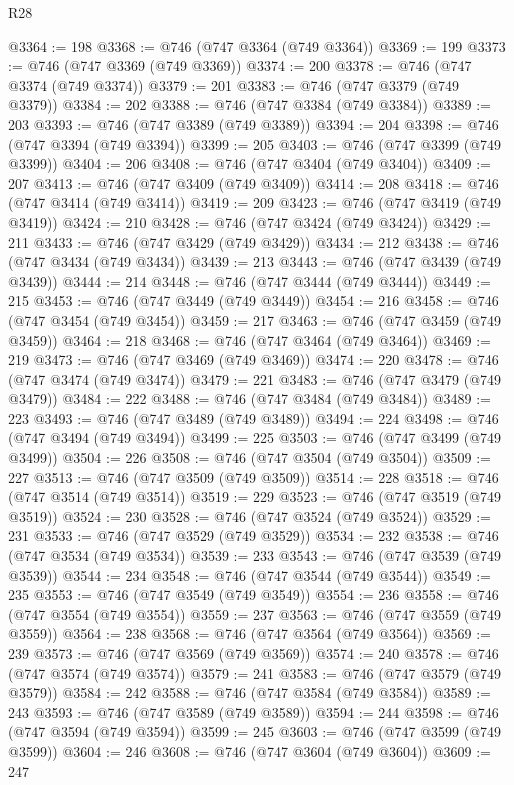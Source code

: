 \begin{lexlean}{R28}
\begin{coremodule}
@3364 := 198
@3368 := @746 (@747 @3364 (@749 @3364))
@3369 := 199
@3373 := @746 (@747 @3369 (@749 @3369))
@3374 := 200
@3378 := @746 (@747 @3374 (@749 @3374))
@3379 := 201
@3383 := @746 (@747 @3379 (@749 @3379))
@3384 := 202
@3388 := @746 (@747 @3384 (@749 @3384))
@3389 := 203
@3393 := @746 (@747 @3389 (@749 @3389))
@3394 := 204
@3398 := @746 (@747 @3394 (@749 @3394))
@3399 := 205
@3403 := @746 (@747 @3399 (@749 @3399))
@3404 := 206
@3408 := @746 (@747 @3404 (@749 @3404))
@3409 := 207
@3413 := @746 (@747 @3409 (@749 @3409))
@3414 := 208
@3418 := @746 (@747 @3414 (@749 @3414))
@3419 := 209
@3423 := @746 (@747 @3419 (@749 @3419))
@3424 := 210
@3428 := @746 (@747 @3424 (@749 @3424))
@3429 := 211
@3433 := @746 (@747 @3429 (@749 @3429))
@3434 := 212
@3438 := @746 (@747 @3434 (@749 @3434))
@3439 := 213
@3443 := @746 (@747 @3439 (@749 @3439))
@3444 := 214
@3448 := @746 (@747 @3444 (@749 @3444))
@3449 := 215
@3453 := @746 (@747 @3449 (@749 @3449))
@3454 := 216
@3458 := @746 (@747 @3454 (@749 @3454))
@3459 := 217
@3463 := @746 (@747 @3459 (@749 @3459))
@3464 := 218
@3468 := @746 (@747 @3464 (@749 @3464))
@3469 := 219
@3473 := @746 (@747 @3469 (@749 @3469))
@3474 := 220
@3478 := @746 (@747 @3474 (@749 @3474))
@3479 := 221
@3483 := @746 (@747 @3479 (@749 @3479))
@3484 := 222
@3488 := @746 (@747 @3484 (@749 @3484))
@3489 := 223
@3493 := @746 (@747 @3489 (@749 @3489))
@3494 := 224
@3498 := @746 (@747 @3494 (@749 @3494))
@3499 := 225
@3503 := @746 (@747 @3499 (@749 @3499))
@3504 := 226
@3508 := @746 (@747 @3504 (@749 @3504))
@3509 := 227
@3513 := @746 (@747 @3509 (@749 @3509))
@3514 := 228
@3518 := @746 (@747 @3514 (@749 @3514))
@3519 := 229
@3523 := @746 (@747 @3519 (@749 @3519))
@3524 := 230
@3528 := @746 (@747 @3524 (@749 @3524))
@3529 := 231
@3533 := @746 (@747 @3529 (@749 @3529))
@3534 := 232
@3538 := @746 (@747 @3534 (@749 @3534))
@3539 := 233
@3543 := @746 (@747 @3539 (@749 @3539))
@3544 := 234
@3548 := @746 (@747 @3544 (@749 @3544))
@3549 := 235
@3553 := @746 (@747 @3549 (@749 @3549))
@3554 := 236
@3558 := @746 (@747 @3554 (@749 @3554))
@3559 := 237
@3563 := @746 (@747 @3559 (@749 @3559))
@3564 := 238
@3568 := @746 (@747 @3564 (@749 @3564))
@3569 := 239
@3573 := @746 (@747 @3569 (@749 @3569))
@3574 := 240
@3578 := @746 (@747 @3574 (@749 @3574))
@3579 := 241
@3583 := @746 (@747 @3579 (@749 @3579))
@3584 := 242
@3588 := @746 (@747 @3584 (@749 @3584))
@3589 := 243
@3593 := @746 (@747 @3589 (@749 @3589))
@3594 := 244
@3598 := @746 (@747 @3594 (@749 @3594))
@3599 := 245
@3603 := @746 (@747 @3599 (@749 @3599))
@3604 := 246
@3608 := @746 (@747 @3604 (@749 @3604))
@3609 := 247

\end{coremodule}
\end{lexlean}
